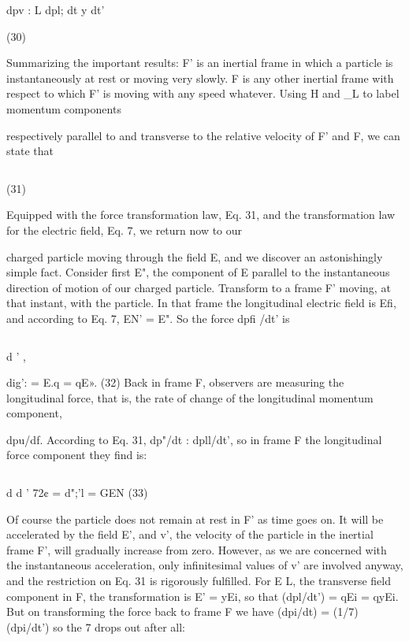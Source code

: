\begin{equation}
\end{equation}

dpv : L dpl;
dt y dt'

(30)

Summarizing the important results: F' is an inertial frame in
which a particle is instantaneously at rest or moving very slowly. F is
any other inertial frame with respect to which F' is moving with any
speed whatever. Using H and _L to label momentum components

respectively parallel to and transverse to the relative velocity of F'
and F, we can state that

\begin{equation}
\end{equation}

(31)

 

Equipped with the force transformation law, Eq. 31, and the transformation
law for the electric field, Eq. 7, we return now to our

charged particle moving through the field E, and we discover an
astonishingly simple fact. Consider first E", the component of E
parallel to the instantaneous direction of motion of our charged
particle. Transform to a frame F' moving, at that instant, with the
particle. In that frame the longitudinal electric field is Efi, and
according to Eq. 7, EN' = E". So the force dpfi /dt' is

\begin{equation}
\end{equation}

d ' ,

dig': = E.q = qE». (32)
Back in frame F, observers are measuring the longitudinal force, that
is, the rate of change of the longitudinal momentum component,

dpu/df. According to Eq. 31, dp"/dt : dpll/dt', so in frame F the
longitudinal force component they find is:

\begin{equation}
\end{equation}

d d '
72¢ = d";'l = GEN (33)

Of course the particle does not remain at rest in F' as time goes on.
It will be accelerated by the field E', and v', the velocity of the particle
in the inertial frame F', will gradually increase from zero. However,
as we are concerned with the instantaneous acceleration, only
infinitesimal values of v' are involved anyway, and the restriction
on Eq. 31 is rigorously fulfilled. For E L, the transverse field component
in F, the transformation is E' = yEi, so that (dpl/dt') =
qEi = qyEi. But on transforming the force back to frame F we have
(dpi/dt) = (1/7) (dpi/dt') so the 7 drops out after all:

